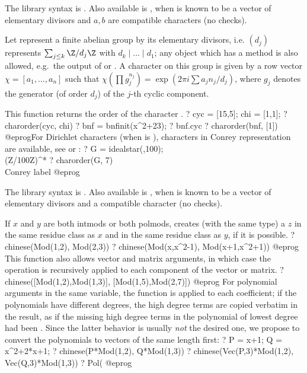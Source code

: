 The library syntax is .
Also available is
, when  is known to
be a vector of elementary divisors and $a, b$ are compatible characters
(no checks).

\label{se:charorder}
Let  represent a finite abelian group by its elementary
divisors, i.e. $(d_j)$ represents $\sum_{j \leq k} \Z/d_j\Z$ with $d_k
\mid \dots \mid d_1$; any object which has a  method is also
allowed, e.g.~the output of  or . A character
on this group is given by a row vector $\chi = [a_1,\ldots,a_n]$ such that
$\chi(\prod g_j^{n_j}) = \exp(2\pi i\sum a_j n_j / d_j)$, where $g_j$ denotes
the generator (of order $d_j$) of the $j$-th cyclic component.

This function returns the order of the character .
\bprog
? cyc = [15,5]; chi = [1,1];
? charorder(cyc, chi)
? bnf = bnfinit(x^2+23);
? bnf.cyc
? charorder(bnf, [1])
@eprog\noindent For Dirichlet characters (when  is
), characters in Conrey representation are available,
see  or :
\bprog
? G = idealstar(,100); \\ (Z/100Z)^*
? charorder(G, 7)   \\ Conrey label
@eprog

The library syntax is .
Also available is
, when  is known to
be a vector of elementary divisors and  a compatible character
(no checks).

\label{se:chinese}
If $x$ and $y$ are both intmods or both polmods, creates (with the same
type) a $z$ in the same residue class as $x$ and in the same residue class as
$y$, if it is possible.
\bprog
? chinese(Mod(1,2), Mod(2,3))
? chinese(Mod(x,x^2-1), Mod(x+1,x^2+1))
@eprog\noindent
This function also allows vector and matrix arguments, in which case the
operation is recursively applied to each component of the vector or matrix.
\bprog
? chinese([Mod(1,2),Mod(1,3)], [Mod(1,5),Mod(2,7)])
@eprog\noindent
For polynomial arguments in the same variable, the function is applied to each
coefficient; if the polynomials have different degrees, the high degree terms
are copied verbatim in the result, as if the missing high degree terms in the
polynomial of lowest degree had been . Since the latter
behavior is usually \emph{not} the desired one, we propose to convert the
polynomials to vectors of the same length first:
\bprog
 ? P = x+1; Q = x^2+2*x+1;
 ? chinese(P*Mod(1,2), Q*Mod(1,3))
 ? chinese(Vec(P,3)*Mod(1,2), Vec(Q,3)*Mod(1,3))
 ? Pol(%
@eprog

